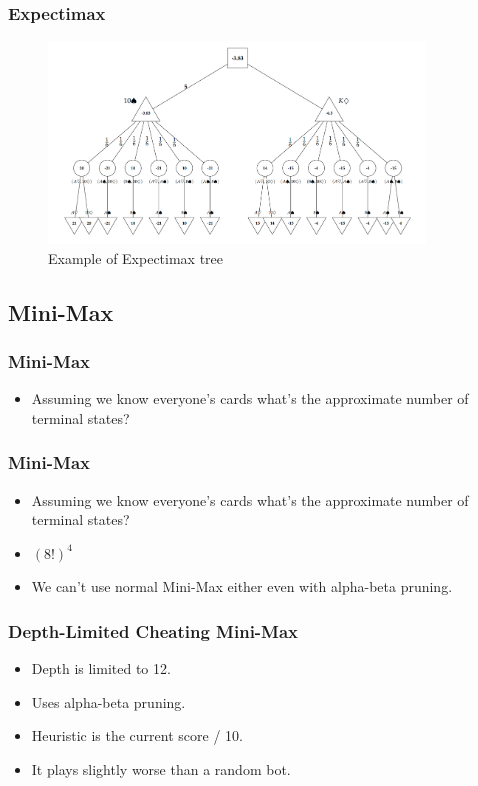 \documentclass{beamer}
\begin{document}
\begin{frame}\frametitle{Expectimax}
    \begin{center}
        \begin{figure}
        \caption{Example of Expectimax tree}
	    \includegraphics[width=10cm]{MiniMax_Tree.png}
        \end{figure}
    \end{center}        
\end{frame}

\subsection{Mini-Max}
\begin{frame}\frametitle{Mini-Max}
    \begin{itemize}
        \item Assuming we know everyone's cards what's the approximate number of terminal states?
    \end{itemize}
\end{frame}

\begin{frame}\frametitle{Mini-Max}
        \begin{itemize}
            \item Assuming we know everyone's cards what's the approximate number of terminal states?
            \item $(8!)^4$
            \item We can't use normal Mini-Max either even with alpha-beta pruning.
        \end{itemize}
\end{frame}

\begin{frame}\frametitle{Depth-Limited Cheating Mini-Max}
    \begin{itemize}
        \item Depth is limited to 12.
        \item Uses alpha-beta pruning.
        \item Heuristic is the current score / 10.
        \item It plays slightly worse than a random bot.
    \end{itemize}
\end{frame}
\end{document}
